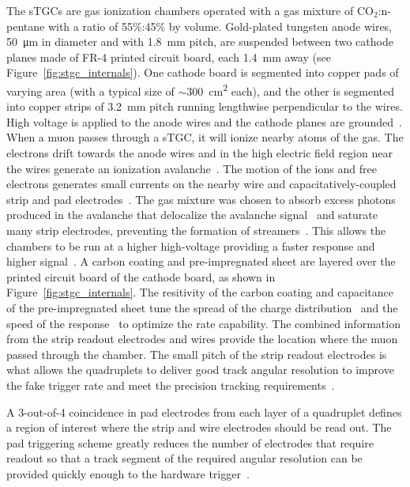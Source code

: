 The sTGCs are gas ionization chambers operated with a gas mixture of CO$_2$:n-pentane with a ratio of 55\%:45\% by volume. Gold-plated tungsten anode wires, \SI{50}{\micro\meter} in diameter and with \SI{1.8}{mm} pitch, are suspended between two cathode planes made of FR-4 printed circuit board, each \SI{1.4}{mm} away (see Figure~\ref{fig:stgc_internals}). One cathode board is segmented into copper pads of varying area (with a typical size of $\sim$\SI{300}{cm^2} each), and the other is segmented into copper strips of \SI{3.2}{mm} pitch running lengthwise perpendicular to the wires. High voltage is applied to the anode wires and the cathode planes are grounded~\cite{nsw_tdr, perez-codina_small-strip_2016}. When a muon passes through a sTGC, it will ionize nearby atoms of the gas. The electrons drift towards the anode wires and in the high electric field region near the wires generate an ionization avalanche~\cite{townsend_electricity_1915}. The motion of the ions and free electrons generates small currents on the nearby wire and capacitatively-coupled strip and pad electrodes~\cite{nsw_tdr}. The gas mixture was chosen to absorb excess photons produced in the avalanche that delocalize the avalanche signal~\cite{majewski_thin_1983} and saturate many strip electrodes, preventing the formation of streamers~\cite{grupen_particle_2008}.  This allows the chambers to be run at a higher high-voltage providing a faster response and higher signal~\cite{majewski_thin_1983}. A carbon coating and pre-impregnated sheet are layered over the printed circuit board of the cathode board, as shown in Figure~\ref{fig:stgc_internals}. The resitivity of the carbon coating and capacitance of the pre-impregnated sheet tune the spread of the charge distribution~\cite{gatti_optimum_1979} and the speed of the response~\cite{battistoni_resistive_1982} to optimize the rate capability. The combined information from the strip readout electrodes and wires provide the location where the muon passed through the chamber. The small pitch of the strip readout electrodes is what allows the quadruplets to deliver good track angular resolution to improve the fake trigger rate and meet the precision tracking requirements~\cite{nsw_tdr}.

A 3-out-of-4 coincidence in pad electrodes from each layer of a quadruplet defines a region of interest where the strip and wire electrodes should be read out. The pad triggering scheme greatly reduces the number of electrodes that require readout so that a track segment of the required angular resolution can be provided quickly enough to the hardware trigger~\cite{nsw_tdr}.

